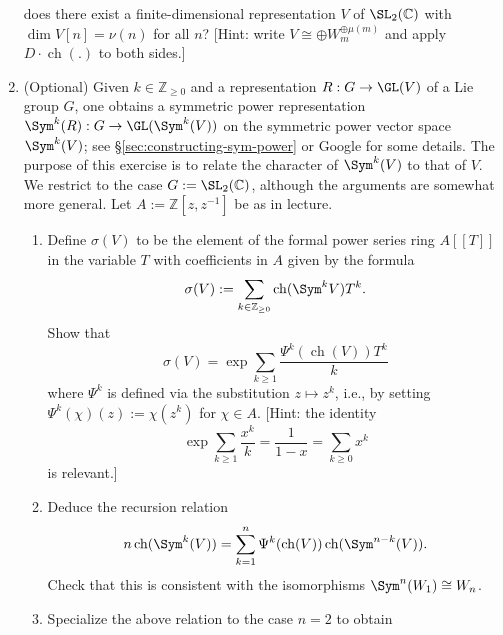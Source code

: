 \documentclass[reqno]{amsart} 
\begin{document}
\begin{homework}
\begin{enumerate}
    does there exist a finite-dimensional representation $V$ of $\SL_2(\mathbb{C})$
    with $\dim V[n] = \nu(n)$ for all $n$?
    [Hint: write $V \cong \oplus W_m^{\oplus \mu(m)}$ and apply $D \cdot \operatorname{ch}(.)$ to both sides.]
  \item
    (Optional)
    Given $k \in \mathbb{Z}_{\geq 0}$ and
    a representation $R : G \rightarrow \GL(V)$
    of a Lie group $G$,
    one obtains a symmetric power representation
    $\Sym^k(R) : G \rightarrow \GL(\Sym^k(V))$
    on the symmetric power vector space $\Sym^k(V)$;
    see \S\ref{sec:constructing-sym-power} or Google for some details.
    The purpose of this exercise is to relate
    the character of $\Sym^k(V)$ to that of $V$.
    We restrict to the case $G := \SL_2(\mathbb{C})$,
    although the arguments are somewhat more general.
    Let $A := \mathbb{Z}[z,z^{-1}]$ be as in lecture.
    \begin{enumerate}
      \item
    Define $\sigma(V)$ to be the element of the formal power
    series ring
    $A[[T]]$ in the variable $T$ with coefficients in $A$
    given by the formula
    \begin{equation*}
      \sigma(V) := \sum_{k \in \mathbb{Z}_{\geq 0}}
      \operatorname{ch}(\Sym^k V) T^k.
    \end{equation*}
    Show that
    \begin{equation*}
      \sigma(V) = \exp \sum _{k \geq 1}
      \frac{\Psi^k(\operatorname{ch}(V)) T^k}{k }
    \end{equation*}
    where $\Psi^k$
    is defined
    via the substitution $z \mapsto z^k$,
    i.e., by setting
    $\Psi^k(\chi)(z) := \chi(z^k)$ for $\chi \in A$.
    [Hint:
    the identity
    \begin{equation*}
      \exp \sum_{k \geq 1}
      \frac{x^k}{k}
      =
      \frac{1}{1-x}
      = \sum_{k \geq 0}
      x^k
    \end{equation*}
    is relevant.]
  \item 
    Deduce the recursion relation
    \begin{equation*}
      n \operatorname{ch}(\Sym^k (V)) = \sum_{k = 1}^n
      \Psi^k(\operatorname{ch}(V))
      \operatorname{ch}(\Sym^{n-k}(V)).
    \end{equation*}
    Check that this is consistent
    with the isomorphisms
    $\Sym^n(W_1) \cong W_n$.
  \item
    Specialize the above relation to the case $n = 2$
    to obtain
    \begin{equation*}

\end{equation*}
\end{enumerate}
\end{enumerate}
\end{homework}
\end{document}
